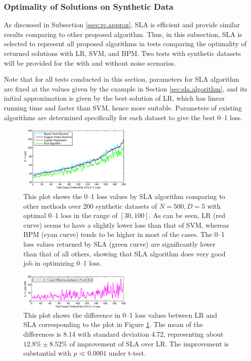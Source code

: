 \subsubsection{Optimality of Solutions on Synthetic Data}
\label{ssec:rc.optimality}

As discussed in Subsection \ref{ssec:rc.approx}, SLA is efficient and provide similar results comparing to other proposed algorithm. Thus, in this subsection, SLA is selected to represent all proposed algorithms in tests comparing the optimality of returned solutions with LR, SVM, and BPM. Two tests with synthetic datasets will be provided for the with and without noise scenarios. 

Note that for all tests conducted in this section, parameters for SLA algorithm are fixed at the values given by the example in Section \ref{sec:sla.algorithm}, and its initial approximation is given by the best solution of LR, which has linear running time and faster than SVM, hence more suitable. Parameters of existing algorithms are determined specifically for each dataset to give the best 0--1 loss.

\begin{figure}[ht!]
\includegraphics[width=0.50\textwidth]{images/fig61_621a.eps}
\caption{
This plot shows the 0--1 loss values by SLA algorithm comparing to other methods over 200 synthetic datasets of $N=500, D=5$ with optimal 0--1 loss in the range of $[30, 100]$. As can be seen, LR (red curve) seems to have a slightly lower loss than that of SVM, whereas BPM (cyan curve) tends to be higher in most of the cases. The 0--1 loss values returned by SLA (green curve) are significantly lower than that of all others, showing that SLA algorithm does very good job in optimizing 0--1 loss.  
}
\label{fig:621a}
\end{figure}

\begin{figure}[ht!]
\includegraphics[width=0.50\textwidth]{images/fig61_621aDiff.eps}
\caption{
This plot shows the difference in 0--1 loss values between LR and SLA corresponding to the plot in Figure \ref{fig:621a}. The mean of the differences is 8.14 with standard deviation 4.72, representing about $12.8\% \pm 8.52\%$ of improvement of SLA over LR. The improvement is substantial with $p \ll 0.0001$ under t-test. 
}
\label{fig:621aDiff}
\end{figure}

